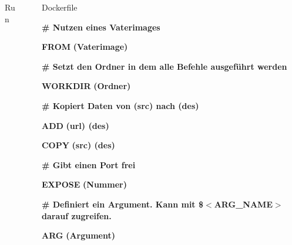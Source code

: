 \documentclass[final]{beamer}
\newlength{\sepwid}
\newlength{\onecolwid}
\newlength{\specialcolwid}
\begin{document}
\begin{frame}
\begin{columns}[t]
\begin{column}{\specialcolwid}
\begin{block}{Run}
\end{block}



\end{column} %

\begin{column}{\sepwid}\end{column} %

\begin{column}{\onecolwid} %





\begin{block}{Dockerfile}

\par \textcolor{docker-green}{\textbf{\# Nutzen eines Vaterimages}}
\par \textcolor{docker-pu}{\textbf{FROM}} \textcolor{docker-red}{\textbf{(Vaterimage)}}

\vspace{1cm}
\par \textcolor{docker-green}{\textbf{\# Setzt den Ordner in dem alle Befehle ausgeführt werden}}
\par \textcolor{docker-pu}{\textbf{WORKDIR}} \textcolor{docker-red}{\textbf{(Ordner)}}

\vspace{1cm}
\par \textcolor{docker-green}{\textbf{\# Kopiert Daten von (src) nach (des)}}
\par \textcolor{docker-pu}{\textbf{ADD}} \textcolor{docker-red}{\textbf{(url) (des)}}
\par \textcolor{docker-pu}{\textbf{COPY}} \textcolor{docker-red}{\textbf{(src) (des)}}

\vspace{1cm}
\par \textcolor{docker-green}{\textbf{\# Gibt einen Port frei}}
\par \textcolor{docker-pu}{\textbf{EXPOSE}} \textcolor{docker-red}{\textbf{(Nummer)}}

\vspace{1cm}
\par \textcolor{docker-green}{\textbf{\# Definiert ein Argument. Kann mit \$$<$ARG\_NAME$>$ darauf zugreifen.}}
\par \textcolor{docker-pu}{\textbf{ARG}} \textcolor{docker-red}{\textbf{(Argument)}}


\end{block}
\end{column}
\end{columns}
\end{frame}
\end{document}
